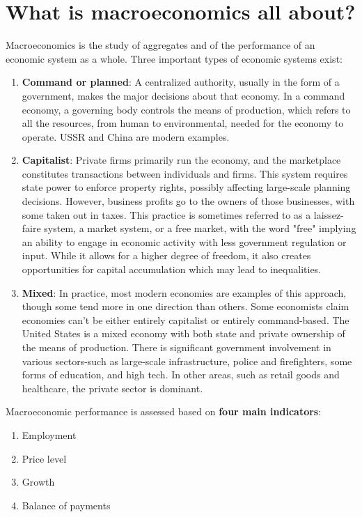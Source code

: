 \documentclass[10pt]{article}
\begin{document}
\section*{What is macroeconomics all about?}
Macroeconomics is the study of aggregates and of the performance of an economic system as a whole. Three important types of economic systems exist:

\begin{enumerate}
  \item \textbf{Command or planned}: A centralized authority, usually in the form of a government, makes the major decisions about that economy. In a command economy, a governing body controls the means of production, which refers to all the resources, from human to environmental, needed for the economy to operate. USSR and China are modern examples.
  \item \textbf{Capitalist}: Private firms primarily run the economy, and the marketplace constitutes transactions between individuals and firms. This system requires state power to enforce property rights, possibly affecting large-scale planning decisions. However, business profits go to the owners of those businesses, with some taken out in taxes. This practice is sometimes referred to as a laissez-faire system, a market system, or a free market, with the word "free" implying an ability to engage in economic activity with less government regulation or input. While it allows for a higher degree of freedom, it also creates opportunities for capital accumulation which may lead to inequalities.
  \item \textbf{Mixed}: In practice, most modern economies are examples of this approach, though some tend more in one direction than others. Some economists claim economies can't be either entirely capitalist or entirely command-based. The United States is a mixed economy with both state and private ownership of the means of production. There is significant government involvement in various sectors-such as large-scale infrastructure, police and firefighters, some forms of education, and high tech. In other areas, such as retail goods and healthcare, the private sector is dominant.
\end{enumerate}

Macroeconomic performance is assessed based on \textbf{four main indicators}:

\begin{enumerate}
  \item Employment
  \item Price level
  \item Growth
  \item Balance of payments
\end{enumerate}
\end{document}
